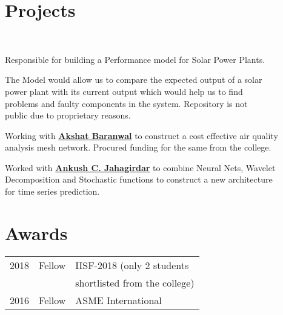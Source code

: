 \documentclass[]{limos-resume-openfont}
\begin{document}
\begin{minipage}[t]{0.66\textwidth}
\section{Projects}

\\
\begin{tightemize}
\item Responsible for building a Performance model for Solar Power Plants.
\item The Model would allow us to compare the expected output of a solar\\
power plant with its current output which would help us to find\\
problems and faulty components in the system. Repository is not\\
public due to proprietary reasons.
\end{tightemize}
\sectionsep

Working with \textbf{\href{https://www.linkedin.com/in/akshat-baranwal-9b99a112a/}{Akshat Baranwal}} to construct a cost effective air quality \\analysis mesh network. Procured funding for the same from the college.
\sectionsep

Worked with \textbf{\href{https://www.bits-pilani.ac.in/pilani/ankushchandrakant/profile}{Ankush C. Jahagirdar}} to combine Neural Nets, Wavelet Decomposition and Stochastic functions to construct a new architecture \\for time series prediction.
\sectionsep


\section{Awards} 
\begin{tabular}{rll}
2018	     & Fellow  & IISF-2018 (only 2 students\\
             &          &shortlisted from the college)\\
2016	     & Fellow  & ASME International\\


\end{tabular}
\end{minipage}
\end{document}
